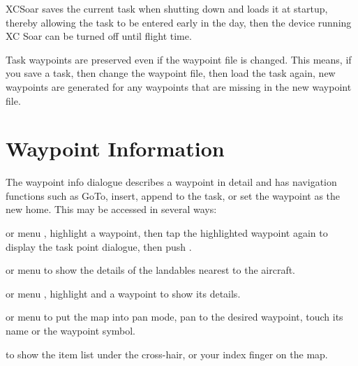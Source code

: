 XCSoar saves the current task when shutting down and loads it at
startup, thereby allowing the task to be entered early in the day,
then the device running XC Soar can be turned off until flight time.

Task waypoints are preserved even if the waypoint
file is changed.  This means, if you save a task, then change the
waypoint file, then load the task again, new waypoints are generated
for any waypoints that are missing in the new waypoint file.

\section{Waypoint Information}

The waypoint info dialogue describes a waypoint in detail and has
navigation functions such as GoTo, insert, append to the task, or set the 
waypoint as the new home.
This may be accessed in several ways:

or menu \blink{},
highlight a waypoint, then tap the highlighted waypoint again to display the 
task point dialogue, then push .

or menu \blink{}
to show the
details of the landables nearest to the aircraft.

or menu \blink{}
, highlight and  a waypoint to show its details.

or menu \blink{} to put the 
map into pan mode, pan to the desired waypoint, touch its name or the waypoint 
symbol.

\blink{}
to show the
item list under the cross-hair, or your index finger on the map.

